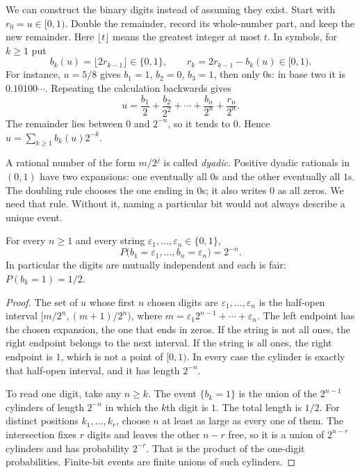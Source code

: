 We can construct the binary digits instead of assuming they exist. Start with $r_0=u\in[0,1)$. Double the remainder, record its whole-number part, and keep the new remainder. Here $\lfloor t\rfloor$ means the greatest integer at most $t$. In symbols, for $k\ge1$ put
\[
 b_k(u)=\lfloor 2r_{k-1}\rfloor\in\{0,1\},
 \qquad r_k=2r_{k-1}-b_k(u)\in[0,1).
\]
For instance, $u=5/8$ gives $b_1=1$, $b_2=0$, $b_3=1$, then only $0$s: in base two it is $0.10100\cdots$. Repeating the calculation backwards gives
\[
 u=\frac{b_1}{2}+\frac{b_2}{2^2}+\cdots+\frac{b_n}{2^n}+\frac{r_n}{2^n}.
\]
The remainder lies between $0$ and $2^{-n}$, so it tends to $0$. Hence $u=\sum_{k\ge1}b_k(u)2^{-k}$.

A rational number of the form $m/2^j$ is called \emph{dyadic}. Positive dyadic rationals in $(0,1)$ have two expansions: one eventually all $0$s and the other eventually all $1$s. The doubling rule chooses the one ending in $0$s; it also writes $0$ as all zeros. We need that rule. Without it, naming a particular bit would not always describe a unique event.

\begin{proposition}\label{prop:bits}
For every $n\ge1$ and every string $\varepsilon_1,\ldots,\varepsilon_n\in\{0,1\}$,
\[
 P\bigl(b_1=\varepsilon_1,\ldots,b_n=\varepsilon_n\bigr)=2^{-n}.
\]
In particular the digits are mutually independent and each is fair: $P(b_k=1)=1/2$.
\end{proposition}
\begin{proof}
The set of $u$ whose first $n$ chosen digits are $\varepsilon_1,\ldots,\varepsilon_n$ is the half-open interval $[m/2^n,(m+1)/2^n)$, where $m=\varepsilon_1 2^{n-1}+\cdots+\varepsilon_n$. The left endpoint has the chosen expansion, the one that ends in zeros. If the string is not all ones, the right endpoint belongs to the next interval. If the string is all ones, the right endpoint is $1$, which is not a point of $[0,1)$. In every case the cylinder is exactly that half-open interval, and it has length $2^{-n}$.

To read one digit, take any $n\ge k$. The event $\{b_k=1\}$ is the union of the $2^{n-1}$ cylinders of length $2^{-n}$ in which the $k$th digit is $1$. The total length is $1/2$. For distinct positions $k_1,\ldots,k_r$, choose $n$ at least as large as every one of them. The intersection fixes $r$ digits and leaves the other $n-r$ free, so it is a union of $2^{n-r}$ cylinders and has probability $2^{-r}$. That is the product of the one-digit probabilities. Finite-bit events are finite unions of such cylinders.
\end{proof}

